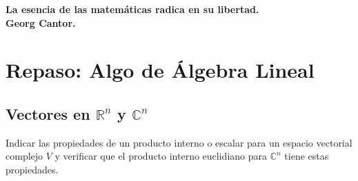 \documentclass[12pt]{book}
\newcommand{\C}{\mathbb{C}}
\newcommand{\R}{\mathbb{R}}
\begin{document}
\begin{center}
    {\small  \bfseries La esencia de las matemáticas radica en su libertad. \\Georg Cantor.}
\end{center}

\chapter{Repaso: Algo de Álgebra Lineal}
\section{Vectores en $\R^n$ y $\C^n$}


\eje Indicar las propiedades de un producto interno o escalar para un espacio vectorial complejo $V$ y verificar que el producto interno euclidiano para $\C^n$ tiene estas propiedades.
\end{document}

